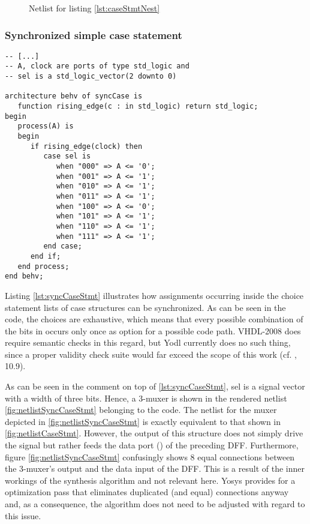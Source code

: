 \begin{figure}[p]
    \centering
    \caption{Netlist for listing \ref{lst:caseStmtNest}}
    
    \label{fig:netlistCaseStmtNest}
\end{figure}

\subsubsection{Synchronized simple case statement}
\leavevmode\begin{lstlisting}[style=vhdl, caption={Code for a simple synchronized
    case statement}, label={lst:syncCaseStmt}]
-- [...]
-- A, clock are ports of type std_logic and
-- sel is a std_logic_vector(2 downto 0)

architecture behv of syncCase is
   function rising_edge(c : in std_logic) return std_logic;
begin
   process(A) is
   begin
      if rising_edge(clock) then
         case sel is
            when "000" => A <= '0';
            when "001" => A <= '1';
            when "010" => A <= '1';
            when "011" => A <= '1';
            when "100" => A <= '0';
            when "101" => A <= '1';
            when "110" => A <= '1';
            when "111" => A <= '1';
         end case;
      end if;
   end process;
end behv;
\end{lstlisting}
%
Listing \ref{lst:syncCaseStmt} illustrates how assignments occurring
inside the choice statement lists of case structures can be
synchronized. As can be seen in the code, the choices are exhaustive,
which means that every possible combination of the bits in 
occurs only once as option for a possible code path. VHDL-2008
does require semantic checks in this regard, but Yodl currently does
no such thing, since a proper validity check suite would far exceed
the scope of this work (cf. \cite{IEEELRM}, 10.9).

As can be seen in the comment on top of \ref{lst:syncCaseStmt}, sel is
a signal vector with a width of three bits. Hence, a 3-muxer is shown
in the rendered netlist \ref{fig:netlistSyncCaseStmt} belonging to the
code. The netlist for the muxer depicted in
\ref{fig:netlistSyncCaseStmt} is exactly equivalent to that shown in
\ref{fig:netlistCaseStmt}. However, the output of this structure does
not simply drive the signal  but rather feeds the data port ()
of the preceding DFF. Furthermore, figure \ref{fig:netlistSyncCaseStmt}
confusingly shows 8 equal connections between the 3-muxer's output and the
data input of the DFF. This is a result of the inner workings of the
synthesis algorithm and not relevant here. Yosys provides for a
optimization pass that eliminates duplicated (and equal) connections
anyway and, as a consequence, the algorithm does not need to be
adjusted with regard to this issue.

